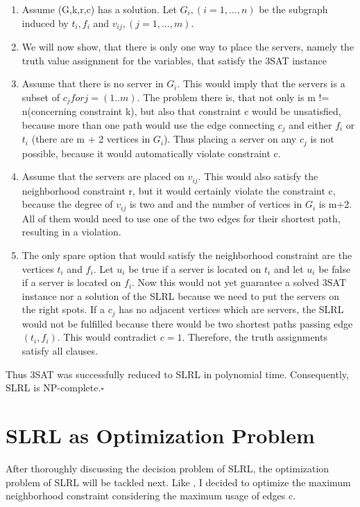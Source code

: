\documentclass [12pt]{article}
\begin{document}
\begin{enumerate}
  \item{Assume (G,k,r,c) has a solution. Let $G_i, (i=1,\dots,n)$ be the subgraph induced
    by $t_i, f_i$ and $v_{ij},(j=1,\dots,m)$.}
  \item{We will now show, that there is only one way to place the servers, namely the truth
    value assignment for the variables, that satisfy the 3SAT instance}
  \item{Assume that there is no server in $G_i$. This would imply that the servers is a subset of
      $c_j for j=(1..m)$. The problem there is, that not only is m != n(concerning constraint k),
      but also that constraint c would be unsatisfied, because more than one path would use 
      the edge connecting $c_j$ and either $f_i$ or $t_i$ (there are m + 2 vertices in $G_i$).
    Thus placing a server on any $c_j$ is not possible, because it would automatically violate constraint c.}
  \item{Assume that the servers are placed on $v_{ij}$. This would also satisfy the neighborhood 
      constraint r, but it would certainly violate the constraint c, because the degree of $v_{ij}$ is two and
      and the number of vertices in $G_i$ is m+2. All of them would need to use one of the two edges for their shortest path,
    resulting in a violation.}
  \item{The only spare option that would satisfy the neighborhood constraint 
      are the vertices $t_i$ and $f_i$. Let $u_i$ be true if a server is located on
      $t_i$ and let $u_i$ be false if a server is located on $f_i$. Now this would not yet 
      guarantee a solved 3SAT instance nor a solution of the SLRL because we need to put
      the servers on the right spots. If a $c_j$ has no adjacent vertices which are servers,
      the SLRL would not be fulfilled because there would be two shortest paths passing edge
      $(t_i,f_i)$. This would contradict $c = 1$. Therefore, the truth assignments satisfy all
    clauses.}
\end{enumerate}
Thus 3SAT was successfully reduced to SLRL in polynomial time.
Consequently, SLRL is NP-complete.$\square$



\section{SLRL as Optimization Problem}

After thoroughly discussing the decision problem of SLRL, the optimization problem
of SLRL will be tackled next. Like \cite{mirrorserver}, I decided to optimize the maximum 
neighborhood constraint considering the maximum usage of edges c.
\end{document}
